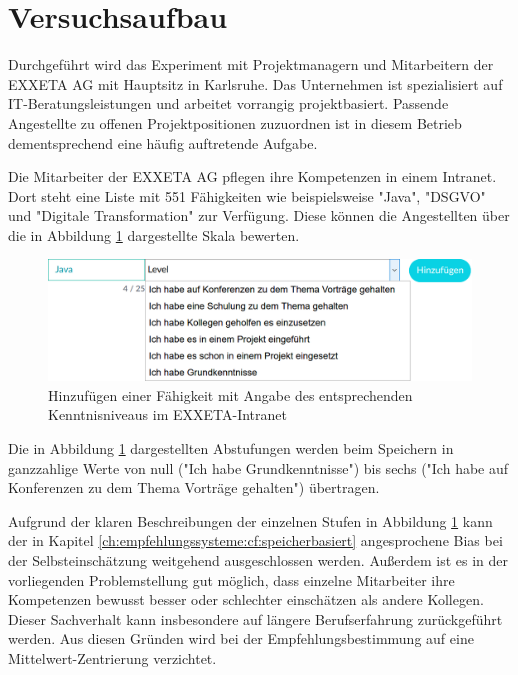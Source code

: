 \section{Versuchsaufbau}
\label{ch:methodik:versuchsaufbau}
Durchgeführt wird das Experiment mit Projektmanagern und Mitarbeitern der EXXETA AG mit Hauptsitz in Karlsruhe. Das Unternehmen ist spezialisiert auf IT-Beratungsleistungen und arbeitet vorrangig projektbasiert. Passende Angestellte zu offenen Projektpositionen zuzuordnen ist in diesem Betrieb dementsprechend eine häufig auftretende Aufgabe.%

Die Mitarbeiter der EXXETA AG pflegen ihre Kompetenzen in einem Intranet. Dort steht eine Liste mit 551 Fähigkeiten wie beispielsweise "Java", "DSGVO" und "Digitale Transformation" zur Verfügung. Diese können die Angestellten über die in Abbildung \ref{fig:methodik:versuchsaufbau:daten:abb1} dargestellte Skala bewerten.

\begin{figure}[h]
	\centering
	\includegraphics[width=1\textwidth]{gfx/skill-level.png}
	\caption{Hinzufügen einer Fähigkeit mit Angabe des entsprechenden Kenntnisniveaus im EXXETA-Intranet}
	\label{fig:methodik:versuchsaufbau:daten:abb1}
\end{figure}

Die in Abbildung \ref{fig:methodik:versuchsaufbau:daten:abb1} dargestellten Abstufungen werden beim Speichern in ganzzahlige Werte von null ("Ich habe Grundkenntnisse") bis sechs ("Ich habe auf Konferenzen zu dem Thema Vorträge gehalten") übertragen.

Aufgrund der klaren Beschreibungen der einzelnen Stufen in Abbildung \ref{fig:methodik:versuchsaufbau:daten:abb1} kann der in Kapitel \ref{ch:empfehlungssysteme:cf:speicherbasiert} angesprochene Bias bei der Selbsteinschätzung weitgehend ausgeschlossen werden. Außerdem ist es in der vorliegenden Problemstellung gut möglich, dass einzelne Mitarbeiter ihre Kompetenzen bewusst besser oder schlechter einschätzen als andere Kollegen. Dieser Sachverhalt kann insbesondere auf längere Berufserfahrung zurückgeführt werden. Aus diesen Gründen wird bei der Empfehlungsbestimmung auf eine Mittelwert-Zentrierung verzichtet.

